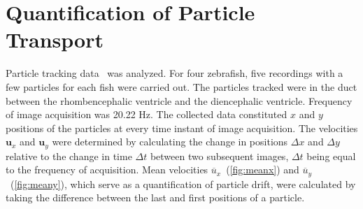 \documentclass[fleqn]{wlscirep}
\newcommand{\uu}{\mathbf{u}}
\begin{document}
\section{Quantification of Particle Transport}\label{sec:appC_particle_transport}
Particle tracking data~\cite{Olstad2019CiliaryDevelopment} was analyzed. For four zebrafish, five recordings with a few particles for each fish were carried out. The particles tracked were in the duct between the rhombencephalic ventricle and the diencephalic ventricle. Frequency of image acquisition was 20.22 Hz. The collected data constituted $x$ and $y$ positions of the particles at every time instant of image acquisition. The velocities $\uu_x$ and $\uu_y$ were determined by calculating the change in positions $\Delta x$ and $\Delta y$ relative to the change in time $\Delta t$ between two subsequent images, $\Delta t$ being equal to the frequency of acquisition. Mean velocities $\overline{u}_x$~(\cref{fig:meanx}) and $\overline{u}_y$~(\cref{fig:meany}), which serve as a quantification of particle drift, were calculated by taking the difference between the last and first positions of a particle.
\end{document}

